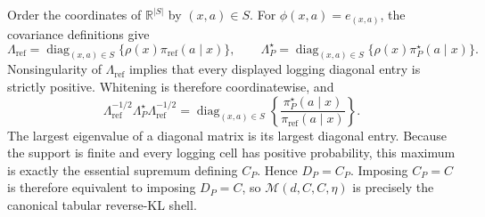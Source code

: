 Order the coordinates of \(\mathbb R^{|S|}\) by \((x,a)\in S\). For \(\phi(x,a)=e_{(x,a)}\), the covariance definitions give
\[
\Lambda_{\mathrm{ref}}
=\operatorname{diag}_{(x,a)\in S}\{\rho(x)\pi_{\mathrm{ref}}(a\mid x)\},
\qquad
\Lambda_P^\star
=\operatorname{diag}_{(x,a)\in S}\{\rho(x)\pi_P^\star(a\mid x)\}.
\]
Nonsingularity of \(\Lambda_{\mathrm{ref}}\) implies that every displayed logging diagonal entry is strictly positive. Whitening is therefore coordinatewise, and
\[
\Lambda_{\mathrm{ref}}^{-1/2}\Lambda_P^\star\Lambda_{\mathrm{ref}}^{-1/2}
=\operatorname{diag}_{(x,a)\in S}
\left\{\frac{\pi_P^\star(a\mid x)}{\pi_{\mathrm{ref}}(a\mid x)}\right\}.
\]
The largest eigenvalue of a diagonal matrix is its largest diagonal entry. Because the support is finite and every logging cell has positive probability, this maximum is exactly the essential supremum defining \(C_P\). Hence \(D_P=C_P\). Imposing \(C_P=C\) is therefore equivalent to imposing \(D_P=C\), so \(\mathcal M(d,C,C,\eta)\) is precisely the canonical tabular reverse-KL shell.